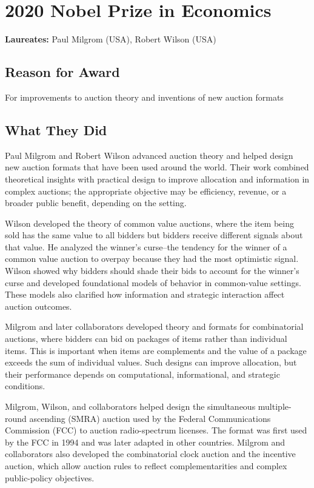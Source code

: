 \chapter{2020 Nobel Prize in Economics}
\textbf{Laureates: }Paul Milgrom (USA), Robert Wilson (USA)

\section*{Reason for Award}
For improvements to auction theory and inventions of new auction formats

\section{What They Did}
Paul Milgrom and Robert Wilson advanced auction theory and helped design new
auction formats that have been used around the world. Their work combined
theoretical insights with practical design to improve allocation and information
in complex auctions; the appropriate objective may be efficiency, revenue, or a
broader public benefit, depending on the setting.

Wilson developed the theory of common value auctions, where the item being sold has the same
value to all bidders but bidders receive different signals about that value. He analyzed the
winner's curse--the tendency for the winner of a common value auction to overpay because they
had the most optimistic signal. Wilson showed why bidders should shade their bids
to account for the winner's curse and developed foundational models of behavior in
common-value settings. These models also clarified how information and strategic
interaction affect auction outcomes.

Milgrom and later collaborators developed theory and formats for combinatorial
auctions, where bidders can bid on packages of items rather than individual
items. This is important when items are complements and the value of a package
exceeds the sum of individual values. Such designs can improve allocation, but
their performance depends on computational, informational, and strategic
conditions.

Milgrom, Wilson, and collaborators helped design the simultaneous multiple-round
ascending (SMRA) auction used by the Federal Communications Commission (FCC) to auction
radio-spectrum licenses. The format was first used by the FCC in 1994 and was
later adapted in other countries. Milgrom and collaborators also developed the
combinatorial clock auction and the incentive auction, which allow auction rules
to reflect complementarities and complex public-policy objectives.

